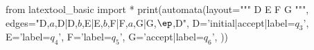 from latextool_basic import *
print(automata(layout="""
   D  E  F  G
""",
edges="D,$a$,D|D,$b$,E|E,$b$,F|F,$a$,G|G,$\ep$,D",
D='initial|accept|label=$q_3$',
E='label=$q_4$',
F='label=$q_5$',
G='accept|label=$q_6$',
))
